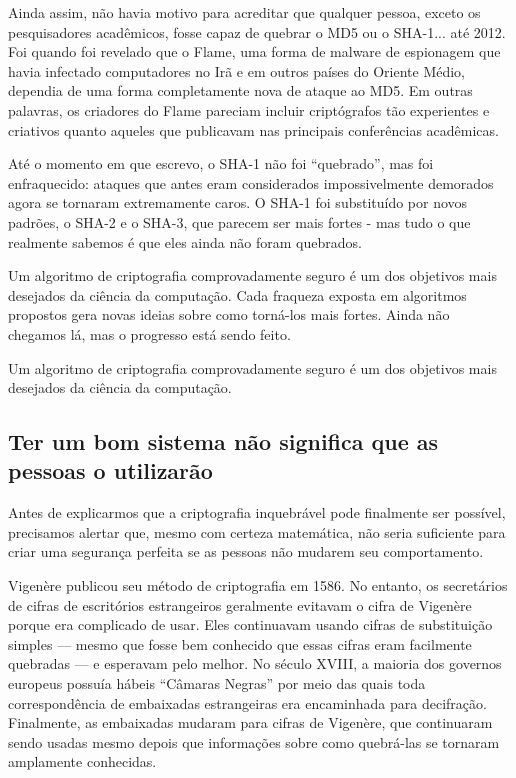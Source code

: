 \documentclass{book}
\begin{document}
Ainda assim, não havia motivo para acreditar que qualquer pessoa, exceto os pesquisadores acadêmicos, fosse capaz de quebrar o MD5 ou o SHA-1... até 2012. Foi quando foi revelado que o Flame, uma forma de malware de espionagem que havia infectado computadores no Irã e em outros países do Oriente Médio, dependia de uma forma completamente nova de ataque ao MD5. Em outras palavras, os criadores do Flame pareciam incluir criptógrafos tão experientes e criativos quanto aqueles que publicavam nas principais conferências acadêmicas.

Até o momento em que escrevo, o SHA-1 não foi ``quebrado'', mas foi enfraquecido: ataques que antes eram considerados impossivelmente demorados agora se tornaram extremamente caros. O SHA-1 foi substituído por novos padrões, o SHA-2 e o SHA-3, que parecem ser mais fortes - mas tudo o que realmente sabemos é que eles ainda não foram quebrados.

Um algoritmo de criptografia comprovadamente seguro é um dos objetivos mais desejados da ciência da computação. Cada fraqueza exposta em algoritmos propostos gera novas ideias sobre como torná-los mais fortes. Ainda não chegamos lá, mas o progresso está sendo feito.

Um algoritmo de criptografia comprovadamente seguro é um dos objetivos mais desejados da ciência da computação.


\subsection{Ter um bom sistema não significa que as pessoas o utilizarão}
\label{segredos:bom-sistema}

Antes de explicarmos que a criptografia inquebrável pode finalmente ser possível, precisamos alertar que, mesmo com certeza matemática, não seria suficiente para criar uma segurança perfeita se as pessoas não mudarem seu comportamento.

Vigenère publicou seu método de criptografia em 1586. No entanto, os secretários de cifras de escritórios estrangeiros geralmente evitavam o cifra de Vigenère porque era complicado de usar. Eles continuavam usando cifras de substituição simples --- mesmo que fosse bem conhecido que essas cifras eram facilmente quebradas --- e esperavam pelo melhor. No século XVIII, a maioria dos governos europeus possuía hábeis ``Câmaras Negras'' por meio das quais toda correspondência de embaixadas estrangeiras era encaminhada para decifração. Finalmente, as embaixadas mudaram para cifras de Vigenère, que continuaram sendo usadas mesmo depois que informações sobre como quebrá-las se tornaram amplamente conhecidas.
\end{document}
